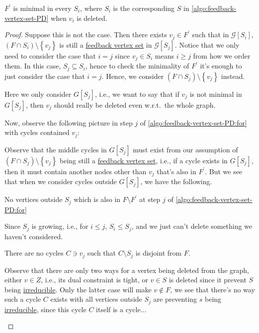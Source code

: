 \begin{lemma}\label{lma:feedback-vertex-set-3}
	\(F^\prime \) is minimal in every \(S_i\), where \(S_i\) is the corresponding \(S\) in \autoref{algo:feedback-vertex-set-PD} when \(v_i\) is deleted.
\end{lemma}
\begin{proof}
	Suppose this is not the case. Then there exists \(v_j\in F^\prime \) such that in \(\mathcal{G} [S_i]\), \((F \cap S_i) \setminus \left\{ v_{j}  \right\}\) is still a \hyperref[prb:feedback-vertex-set]{feedback vertex set} in \(\mathcal{G} [S_j]\). Notice that we only need to consider the case that \(i = j\) since \(v_{j}\in S_i\) means \(i \geq j\) from how we order them. In this case, \(S_j \subseteq S_i\), hence to check the minimality of \(F^\prime \) it's enough to just consider the case that \(i = j\). Hence, we consider \((F \cap S_j) \setminus \left\{ v_{j}  \right\}\) instead.

	\begin{note}
		Here we only consider \(G[S_j]\), i.e., we want to say that if \(v_j\) is not minimal in \(G[S_j]\), then \(v_j\) should really be deleted even w.r.t.\ the whole graph.
	\end{note}

	Now, observe the following picture in step \(j\) of \autoref{algo:feedback-vertex-set-PD:for} with cycles contained \(v_j\):
	\begin{figure}[H]
		\centering
	\end{figure}

	Observe that the middle cycles in \(G[S_j]\) must exist from our assumption of \((F \cap S_j) \setminus \left\{ v_{j}  \right\}\) being still a \hyperref[prb:feedback-vertex-set]{feedback vertex set}, i.e., if a cycle exists in \(G[S_j]\), then it must contain another nodes other than \(v_j\) that's also in \(F^\prime \). But we see that when we consider cycles outside \(G[S_j]\), we have the following.
	\begin{claim}
		No vertices outside \(S_j\) which is also in \(F\setminus F^\prime \) at step \(j\) of \autoref{algo:feedback-vertex-set-PD:for}
	\end{claim}
	\begin{explanation}
		Since \(S_j\) is growing, i.e., for \(i \leq j\), \(S_i \leq S_j\), and we just can't delete something we haven't considered.
	\end{explanation}

	\begin{claim}
		There are no cycles \(C\ni v_j\) such that \(C\setminus S_j\) is disjoint from \(F\).
	\end{claim}
	\begin{explanation}
		Observe that there are only two ways for a vertex being deleted from the graph, either \(v\in Z\), i.e., its dual constraint is tight, or \(v\in S\) is deleted since it prevent \(S\) being \hyperref[def:irreducible]{irreducible}. Only the latter case will make \(v \notin F\), we see that there's no way such a cycle \(C\) exists with all vertices outside \(S_j\) are preventing \(s\) being \hyperref[def:irreducible]{irreducible}, since this cycle \(C\) itself is a cycle...
	\end{explanation}


\end{proof}
